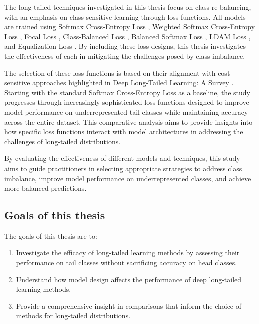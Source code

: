 The long-tailed techniques investigated in this thesis focus on class re-balancing, with an emphasis on class-sensitive learning through loss functions. All models are trained using Softmax Cross-Entropy Loss \cite{cs231n}, Weighted Softmax Cross-Entropy Loss \cite{zhang2023deep}, Focal Loss \cite{lin2018focallossdenseobject}, Class-Balanced Loss \cite{cui2019classbalancedlossbasedeffective}, Balanced Softmax Loss \cite{ren2020balancedmetasoftmaxlongtailedvisual}, LDAM Loss \cite{cao2019learningimbalanceddatasetslabeldistributionaware}, and Equalization Loss \cite{tan2020equalizationlosslongtailedobject}. By including these loss designs, this thesis investigates the effectiveness of each in mitigating the challenges posed by class imbalance.

The selection of these loss functions is based on their alignment with cost-sensitive approaches highlighted in Deep Long-Tailed Learning: A Survey \cite{zhang2023deep}. Starting with the standard Softmax Cross-Entropy Loss as a baseline, the study progresses through increasingly sophisticated loss functions designed to improve model performance on underrepresented tail classes while maintaining accuracy across the entire dataset. This comparative analysis aims to provide insights into how specific loss functions interact with model architectures in addressing the challenges of long-tailed distributions. 

By evaluating the effectiveness of different models and techniques, this study aims to guide practitioners in selecting appropriate strategies to address class imbalance, improve model performance on underrepresented classes, and achieve more balanced predictions.


\subsection{Goals of this thesis}
\label{sec:goals}
The goals of this thesis are to:

\begin{enumerate}
    \item Investigate the efficacy of long-tailed learning methods by assessing their performance on tail classes without sacrificing accuracy on head classes. 
    \item Understand how model design affects the performance of deep long-tailed learning methods.
    \item Provide a comprehensive insight in comparisons that inform the choice of methods for long-tailed distributions.
\end{enumerate}

